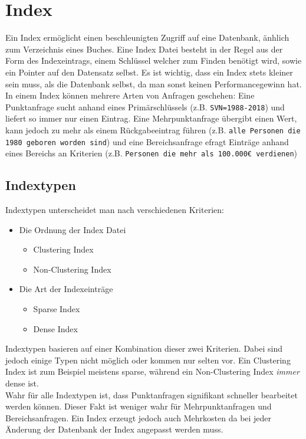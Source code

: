 \documentclass{article}
\begin{document}
	\section{Index}
	Ein Index ermöglicht einen beschleunigten Zugriff auf eine Datenbank, änhlich zum Verzeichnis eines Buches. Eine Index Datei besteht in der Regel aus der Form des Indexeintrags, einem Schlüssel welcher zum Finden benötigt wird, sowie ein Pointer auf den Datensatz selbst. Es ist wichtig, dass ein Index stets kleiner sein muss, als die Datenbank selbst, da man sonst keinen Performancegewinn hat. \\
	In einem Index können mehrere Arten von Anfragen geschehen: Eine Punktanfrage sucht anhand eines Primärschlüssels (z.B. \texttt{SVN=1988-2018}) und liefert so immer nur einen Eintrag. Eine Mehrpunktanfrage übergibt einen Wert, kann jedoch zu mehr als einem Rückgabeeintrag führen (z.B. \texttt{alle Personen die 1980 geboren worden sind}) und eine Bereichsanfrage efragt Einträge anhand eines Bereichs an Kriterien (z.B. \texttt{Personen die mehr als 100.000€ verdienen})
	\subsection{Indextypen}
	Indextypen unterscheidet man nach verschiedenen Kriterien:
	\begin{itemize}
		\item{Die Ordnung der Index Datei}
		\begin{itemize}
			\item{Clustering Index}
			\item{Non-Clustering Index}
		\end{itemize}
		\item{Die Art der Indexeinträge}
		\begin{itemize}
			\item{Sparse Index}
			\item{Dense Index}
		\end{itemize}
	\end{itemize}
	Indextypen basieren auf einer Kombination dieser zwei Kriterien. Dabei sind jedoch einige Typen nicht möglich oder kommen nur selten vor. Ein Clustering Index ist zum Beispiel meistens sparse, während ein Non-Clustering Index \textit{immer} dense ist. \\
	Wahr für alle Indextypen ist, dass Punktanfragen signifikant schneller bearbeitet werden können. Dieser Fakt ist weniger wahr für Mehrpunktanfragen und Bereichsanfragen. Ein Index erzeugt jedoch auch Mehrkosten da bei jeder Änderung der Datenbank der Index angepasst werden muss.
\end{document}
